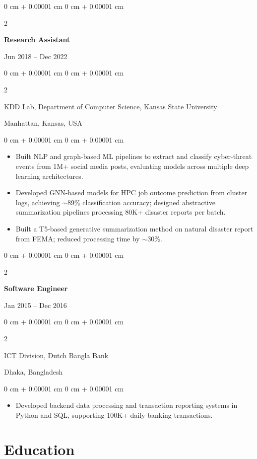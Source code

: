 \documentclass[10pt, letterpaper]{article}
\newenvironment{highlights}{
    \begin{itemize}[
        topsep=0.10 cm,
        parsep=0.10 cm,
        partopsep=0pt,
        itemsep=0pt,
        leftmargin=0 cm + 10pt
    ]
}{
    \end{itemize}
} %
\newenvironment{onecolentry}{
    \begin{adjustwidth}{
        0 cm + 0.00001 cm
    }{
        0 cm + 0.00001 cm
    }
}{
    \end{adjustwidth}
} %
\newenvironment{twocolentry}[2][]{
    \onecolentry
    \def\secondColumn{#2}
    \setcolumnwidth{\fill, 4.5 cm}
    \begin{paracol}{2}
}{
    \switchcolumn \raggedleft \secondColumn
    \end{paracol}
    \endonecolentry
} %
\begin{document}
    \vspace{1mm}

    \begin{twocolentry}{Jun 2018 -- Dec 2022}
        \textbf{Research Assistant}
    \end{twocolentry}
    \begin{twocolentry}{Manhattan, Kansas, USA}
       KDD Lab, Department of Computer Science, Kansas State University
    \end{twocolentry}
    \vspace{0.10 cm}
    \begin{onecolentry}
        \begin{highlights}
            \item Built NLP and graph-based ML pipelines to extract and classify cyber-threat events from 1M+ social media posts, evaluating models across multiple deep learning architectures.
            \item Developed GNN-based models for HPC job outcome prediction from cluster logs, achieving $\sim$89\% classification accuracy; designed abstractive summarization pipelines processing 80K+ disaster reports per batch.
            \item Built a T5-based generative summarization method on natural disaster report from FEMA; reduced processing time by $\sim$30\%.
        \end{highlights}
    \end{onecolentry}

    \vspace{0.1 cm}
    \begin{twocolentry}{Jan 2015 -- Dec 2016}
        \textbf{Software Engineer}
    \end{twocolentry}
    \begin{twocolentry}{Dhaka, Bangladesh}
       ICT Division, Dutch Bangla Bank
    \end{twocolentry}

    \begin{onecolentry}
        \begin{highlights}
            \item Developed backend data processing and transaction reporting systems in Python and SQL, supporting 100K+ daily banking transactions.
        \end{highlights}
    \end{onecolentry}

\section{Education}
\end{document}
